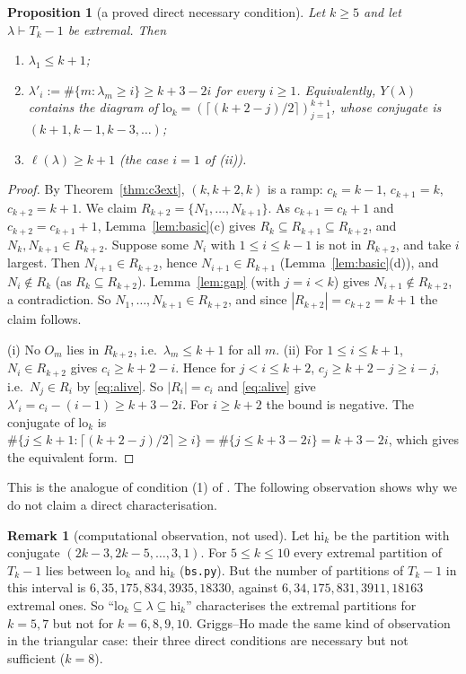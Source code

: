 \documentclass[11pt]{article}
\newtheorem{proposition}[theorem]{Proposition}
\theoremstyle{definition}
\newtheorem{remark}[theorem]{Remark}
\newcommand{\R}{R}
\renewcommand{\le}{\leqslant}
\renewcommand{\ge}{\geqslant}
\begin{document}
\begin{proposition}[a proved direct necessary condition]\label{prop:c3direct}
Let $k\ge5$ and let $\lambda\vdash T_k-1$ be extremal.  Then
\begin{enumerate}
\item[(i)] $\lambda_1\le k+1$;
\item[(ii)] $\lambda'_i:=\#\{m:\lambda_m\ge i\}\ge k+3-2i$ for every $i\ge1$.  Equivalently, $Y(\lambda)$ contains the diagram of
$\mathrm{lo}_k=(\lceil (k+2-j)/2\rceil)_{j=1}^{k+1}$, whose conjugate is $(k+1,k-1,k-3,\dots)$;
\item[(iii)] $\ell(\lambda)\ge k+1$ (the case $i=1$ of (ii)).
\end{enumerate}
\end{proposition}
\begin{proof}
By Theorem~\ref{thm:c3ext}, $(k,k+2,k)$ is a ramp: $c_k=k-1$, $c_{k+1}=k$, $c_{k+2}=k+1$.  We claim
$\R_{k+2}=\{N_1,\dots,N_{k+1}\}$.  As $c_{k+1}=c_k+1$ and $c_{k+2}=c_{k+1}+1$, Lemma~\ref{lem:basic}(c) gives
$\R_k\subseteq \R_{k+1}\subseteq \R_{k+2}$, and $N_k,N_{k+1}\in \R_{k+2}$.  Suppose some $N_i$ with $1\le i\le k-1$ is not in
$\R_{k+2}$, and take $i$ largest.  Then $N_{i+1}\in \R_{k+2}$, hence $N_{i+1}\in \R_{k+1}$ (Lemma~\ref{lem:basic}(d)), and
$N_i\notin \R_k$ (as $\R_k\subseteq \R_{k+2}$).  Lemma~\ref{lem:gap} (with $j=i<k$) gives $N_{i+1}\notin \R_{k+2}$, a contradiction.
So $N_1,\dots,N_{k+1}\in \R_{k+2}$, and since $|\R_{k+2}|=c_{k+2}=k+1$ the claim follows.

(i) No $O_m$ lies in $\R_{k+2}$, i.e.\ $\lambda_m\le k+1$ for all $m$.
(ii) For $1\le i\le k+1$, $N_i\in \R_{k+2}$ gives $c_i\ge k+2-i$.  Hence for $j<i\le k+2$, $c_j\ge k+2-j\ge i-j$, i.e.\
$N_j\in \R_i$ by \eqref{eq:alive}.  So $|\R_i|=c_i$ and \eqref{eq:alive} give $\lambda'_i=c_i-(i-1)\ge k+3-2i$.  For
$i\ge k+2$ the bound is negative.  The conjugate of $\mathrm{lo}_k$ is
$\#\{j\le k+1:\lceil(k+2-j)/2\rceil\ge i\}=\#\{j\le k+3-2i\}=k+3-2i$, which gives the equivalent form.
\end{proof}

This is the analogue of condition (1) of \cite[Thm.~3.8]{GH}.  The following observation shows why we do not
claim a direct characterisation.

\begin{remark}[computational observation, not used]\label{rem:sandwich}
Let $\mathrm{hi}_k$ be the partition with conjugate $(2k-3,2k-5,\dots,3,1)$.  For $5\le k\le10$ every extremal
partition of $T_k-1$ lies between $\mathrm{lo}_k$ and $\mathrm{hi}_k$ (\texttt{bs.py}).  But the number of partitions of
$T_k-1$ in this interval is $6,35,175,834,3935,18330$, against $6,34,175,831,3911,18163$ extremal ones.  So
``$\mathrm{lo}_k\subseteq\lambda\subseteq\mathrm{hi}_k$'' characterises the extremal partitions for $k=5,7$ but not for
$k=6,8,9,10$.  Griggs--Ho made the same kind of observation in the triangular case: their three direct
conditions \cite[Thm.~3.8]{GH} are necessary but not sufficient ($k=8$).
\end{remark}
\end{document}
